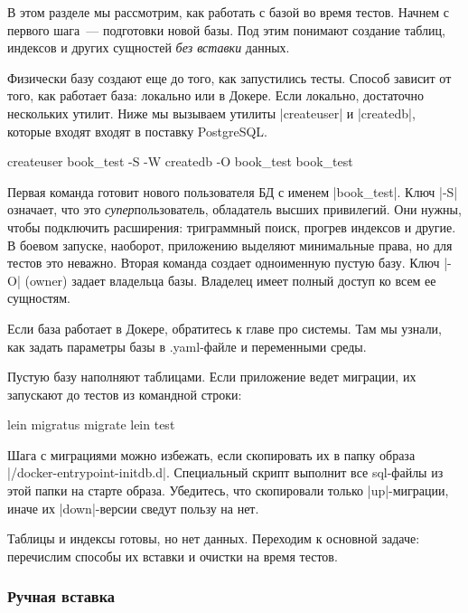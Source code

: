 В этом разделе мы рассмотрим, как работать с базой во время тестов. Начнем с
первого шага~--- подготовки новой базы. Под этим понимают создание таблиц,
индексов и других сущностей \emph{без вставки} данных.

Физически базу создают еще до того, как запустились тесты. Способ зависит от
того, как работает база: локально или в Докере. Если локально, достаточно
нескольких утилит. Ниже мы вызываем утилиты \spverb|createuser| и
\spverb|createdb|, которые входят входят в поставку PostgreSQL.

\begin{english}
  \begin{bash}
createuser book_test -S -W
createdb -O book_test book_test
  \end{bash}
\end{english}

Первая команда готовит нового пользователя БД с именем \spverb|book_test|. Ключ
\spverb|-S| означает, что это \emph{супер}пользователь, обладатель высших
привилегий. Они нужны, чтобы подключить расширения: триграммный поиск, прогрев
индексов и другие. В боевом запуске, наоборот, приложению выделяют минимальные
права, но для тестов это неважно. Вторая команда создает одноименную пустую
базу. Ключ \spverb|-O| (owner) задает владельца базы. Владелец имеет полный
доступ ко всем ее сущностям.

Если база работает в Докере, обратитесь к главе про системы. Там мы узнали, как
задать параметры базы в .yaml-файле и переменными среды.

Пустую базу наполняют таблицами. Если приложение ведет миграции, их запускают до
тестов из командной строки:

\begin{english}
  \begin{clojure}
lein migratus migrate
lein test
  \end{clojure}
\end{english}

Шага с миграциями можно избежать, если скопировать их в папку образа
\spverb|/docker-entrypoint-initdb.d|. Специальный скрипт выполнит все sql-файлы
из этой папки на старте образа. Убедитесь, что скопировали только
\spverb|up|-миграции, иначе их \spverb|down|-версии сведут пользу на нет.

Таблицы и индексы готовы, но нет данных. Переходим к основной задаче: перечислим
способы их вставки и очистки на время тестов.

\subsubsection*{Ручная вставка}

